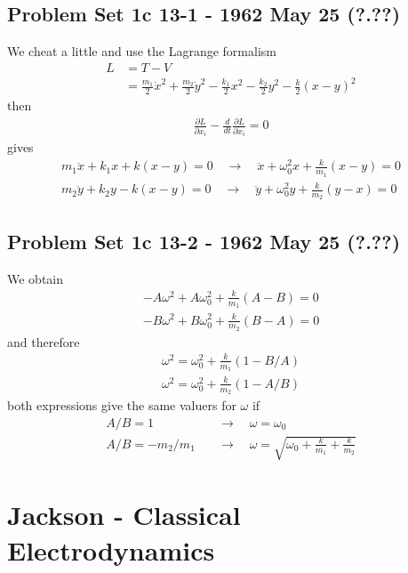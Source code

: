\documentclass[10pt,a4paper]{book}
\theoremstyle{definition}
\begin{document}
\subsection{Problem Set 1c 13-1 - 1962 May 25 (?.??)}
We cheat a little and use the Lagrange formalism 
\begin{align}
L&=T-V\\
&=\frac{m_1}{2}\dot{x}^2+\frac{m_2}{2}\dot{y}^2-\frac{k_1}{2}x^2-\frac{k_2}{2}y^2-\frac{k}{2}(x-y)^2
\end{align}
then
\begin{align}
\frac{\partial L}{\partial x_i}-\frac{d}{dt}\frac{\partial L}{\partial\dot{x}_i}=0
\end{align}
gives
\begin{align}
m_1\ddot{x}+k_1x+k(x-y)=0\quad\rightarrow\quad \ddot{x}+\omega_0^2x+\frac{k}{m_1}(x-y)=0\\
m_2\ddot{y}+k_2y-k(x-y)=0\quad\rightarrow\quad \ddot{y}+\omega_0^2y+\frac{k}{m_2}(y-x)=0
\end{align}


\subsection{Problem Set 1c  13-2 - 1962 May 25 (?.??)}
We obtain
\begin{align}
-A\omega^2+A\omega_0^2+\frac{k}{m_1}(A-B)=0\\
-B\omega^2+B\omega_0^2+\frac{k}{m_2}(B-A)=0
\end{align}
and therefore
\begin{align}
\omega^2=\omega_0^2+\frac{k}{m_1}(1-B/A)\\
\omega^2=\omega_0^2+\frac{k}{m_2}(1-A/B)
\end{align}
both expressions give the same valuers for $\omega$ if
\begin{align}
A/B=1\quad&\rightarrow\quad \omega=\omega_0\\
A/B=-m_2/m_1\quad&\rightarrow\quad \omega=\sqrt{\omega_0+\frac{k}{m_1}+\frac{k}{m_2}}
\end{align} 

\section{{\sc Jackson} - Classical Electrodynamics}
\end{document}
